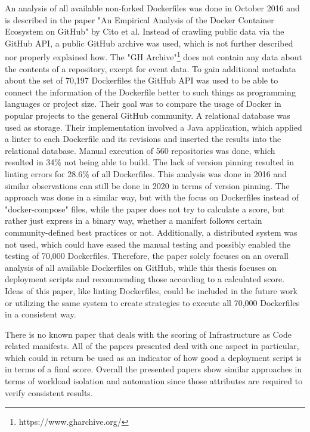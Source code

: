 An analysis of all available non-forked Dockerfiles was done in October 2016 and is described in the paper "An Empirical Analysis of the Docker Container Ecosystem on GitHub" \cite{empirical} by Cito et al. Instead of crawling public data via the GitHub API, a public GitHub archive was used, which is not further described nor properly explained how. The "GH Archive"\footnote{https://www.gharchive.org/} does not contain any data about the contents of a repository, except for event data. To gain additional metadata about the set of 70,197 Dockerfiles the GitHub API was used to be able to connect the information of the Dockerfile better to such things as programming languages or project size. Their goal was to compare the usage of Docker in popular projects to the general GitHub community. A relational database was used as storage. Their implementation involved a Java application, which applied a linter to each Dockerfile and its revisions and inserted the results into the relational database. Manual execution of 560 repositories was done, which resulted in 34\% not being able to build. The lack of version pinning resulted in linting errors for 28.6\% of all Dockerfiles. This analysis was done in 2016 and similar observations can still be done in 2020 in terms of version pinning. The approach was done in a similar way, but with the focus on Dockerfiles instead of "docker-compose" files, while the paper does not try to calculate a score, but rather just express in a binary way, whether a manifest follows certain community-defined best practices or not. Additionally, a distributed system was not used, which could have eased the manual testing and possibly enabled the testing of 70,000 Dockerfiles. Therefore, the paper solely focuses on an overall analysis of all available Dockerfiles on GitHub, while this thesis focuses on deployment scripts and recommending those according to a calculated score. Ideas of this paper, like linting Dockerfiles, could be included in the future work or utilizing the same system to create strategies to execute all 70,000 Dockerfiles in a consistent way.

There is no known paper that deals with the scoring of Infrastructure as Code related manifests. All of the papers presented deal with one aspect in particular, which could in return be used as an indicator of how good a deployment script is in terms of a final score. Overall the presented papers show similar approaches in terms of workload isolation and automation since those attributes are required to verify consistent results.

